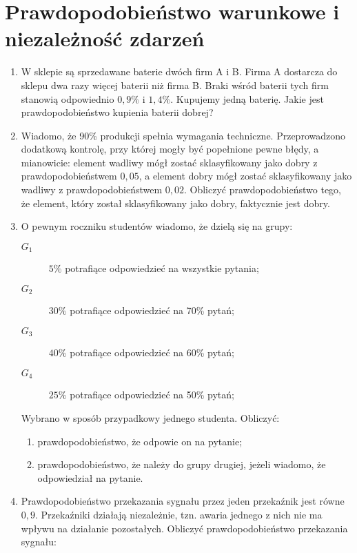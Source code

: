 \documentclass{mwart}
\newcommand{\ans}[1]{}
\newcommand{\ans}[1]{\emph{Odpowiedź:} #1}
\begin{document}
\section{Prawdopodobieństwo warunkowe i niezależność zdarzeń}
\begin{enumerate}
\item W sklepie są sprzedawane baterie dwóch firm A i B. Firma A dostarcza do sklepu dwa razy więcej baterii niż firma B. Braki wśród baterii tych firm stanowią odpowiednio $0{,}9\%$ i $1{,}4\%$. Kupujemy jedną baterię. Jakie jest prawdopodobieństwo kupienia baterii dobrej?
\item Wiadomo, że 90\% produkcji spełnia wymagania techniczne. Przeprowadzono dodatkową kontrolę, przy której mogły być popełnione pewne błędy, a mianowicie: element wadliwy mógł zostać sklasyfikowany jako dobry z prawdopodobieństwem $0{,}05$, a element dobry mógł zostać sklasyfikowany jako wadliwy z prawdopodobieństwem $0{,}02$. Obliczyć prawdopodobieństwo tego, że element, który został sklasyfikowany jako dobry, faktycznie jest dobry. \ans{$P(S|K)=\frac{P(K|S)P(S)}{P(K)}=\frac{(1-P(K'|S))P(S)}{(1-P(K'|S))P(S)+P(K|S')P(S')}=\frac{(1-0{,}02)0{,}9}{(1-0{,}02)0{,}9+0{,}05\cdot0{,}1}\approx0{,}994$}
\item O pewnym roczniku studentów wiadomo, że dzielą się na grupy:
\begin{description}
\item[$G_1$] $5\%$ potrafiące odpowiedzieć na wszystkie pytania;
\item[$G_2$] $30\%$ potrafiące odpowiedzieć na 70\% pytań;
\item[$G_3$] $40\%$ potrafiące odpowiedzieć na 60\% pytań;
\item[$G_4$] $25\%$ potrafiące odpowiedzieć na 50\% pytań;
\end{description}
Wybrano w sposób przypadkowy jednego studenta. Obliczyć:
\begin{enumerate}
\item prawdopodobieństwo, że odpowie on na pytanie; \ans{$P(O)=\sum P(O|G_i)P(G_i)=0{,}625$}
\item prawdopodobieństwo, że należy do grupy drugiej, jeżeli wiadomo, że odpowiedział na pytanie. \ans{$P(G_2|O)=\frac{P(O|G_2)|P(G_2)}{P(O)}=0{,}336$}
\end{enumerate}
\item Prawdopodobieństwo przekazania sygnału przez jeden przekaźnik jest równe $0{,}9$. Przekaźniki działają niezależnie, tzn. awaria jednego z nich nie ma wpływu na działanie pozostałych.
Obliczyć prawdopodobieństwo przekazania sygnału:

\end{enumerate}
\end{document}
